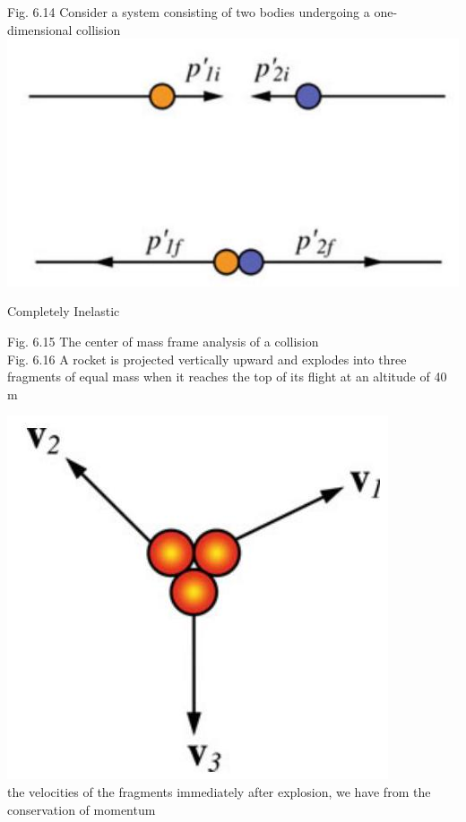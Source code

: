 \documentclass[10pt]{article}
\begin{document}
Fig. 6.14 Consider a system consisting of two bodies undergoing a one-dimensional collision\\
\includegraphics[max width=\textwidth, center]{2024_09_13_db1f357d2aad0a03eb2eg-107(2)}

Completely Inelastic

Fig. 6.15 The center of mass frame analysis of a collision\\
Fig. 6.16 A rocket is projected vertically upward and explodes into three fragments of equal mass when it reaches the top of its flight at an altitude of 40 m

\includegraphics[max width=\textwidth, center]{2024_09_13_db1f357d2aad0a03eb2eg-107}\\
the velocities of the fragments immediately after explosion, we have from the conservation of momentum
\end{document}
